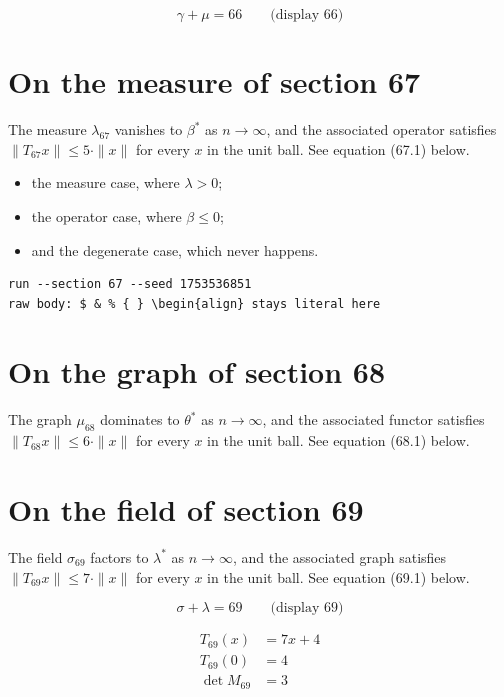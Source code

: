 \documentclass{article}
\begin{document}
$$
\gamma + \mu = 66 \qquad \text{(display 66)}
$$

\section{On the measure of section 67}
The measure $\lambda_{67}$ vanishes to $\beta^{*}$ as $n \to \infty$,
and the associated operator satisfies $\|T_{67} x\| \leq 5 \cdot \|x\|$
for every $x$ in the unit ball. See equation (67.1) below.

\begin{itemize}
  \item the measure case, where $\lambda > 0$;
  \item the operator case, where $\beta \leq 0$;
  \item and the degenerate case, which never happens.
\end{itemize}

\begin{verbatim}
run --section 67 --seed 1753536851
raw body: $ & % { } \begin{align} stays literal here
\end{verbatim}

\section{On the graph of section 68}
The graph $\mu_{68}$ dominates to $\theta^{*}$ as $n \to \infty$,
and the associated functor satisfies $\|T_{68} x\| \leq 6 \cdot \|x\|$
for every $x$ in the unit ball. See equation (68.1) below.

\section{On the field of section 69}
The field $\sigma_{69}$ factors to $\lambda^{*}$ as $n \to \infty$,
and the associated graph satisfies $\|T_{69} x\| \leq 7 \cdot \|x\|$
for every $x$ in the unit ball. See equation (69.1) below.

$$
\sigma + \lambda = 69 \qquad \text{(display 69)}
$$

\begin{align}
T_{69}(x) &= 7 x + 4 \\
T_{69}(0) &= 4 \\
\det M_{69} &= 3
\end{align}
\end{document}
